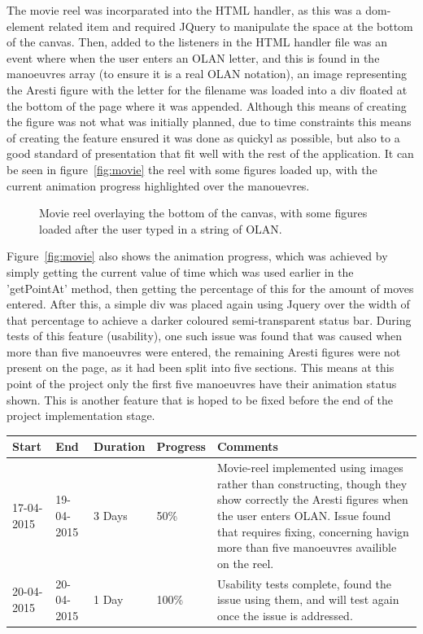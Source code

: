 The movie reel was incorparated into the HTML handler, as this was a dom-element related item and required JQuery to manipulate the space at the bottom of the canvas. Then, added to the listeners in the HTML handler file was an event where when the user enters an OLAN letter, and this is found in the manoeuvres array (to ensure it is a real OLAN notation), an image representing the Aresti figure with the letter for the filename was loaded into a div floated at the bottom of the page where it was appended. Although this means of creating the figure was not what was initially planned, due to time constraints this means of creating the feature ensured it was done as quickyl as possible, but also to a good standard of presentation that fit well with the rest of the application. It can be seen in figure~\ref{fig:movie} the reel with some figures loaded up, with the current animation progress highlighted over the manouevres.

\begin{figure}[h]
  \centering
  \caption{Movie reel overlaying the bottom of the canvas, with some figures loaded after the user typed in a string of OLAN.}
  \label{fig:vectors}
\end{figure}

Figure~\ref{fig:movie} also shows the animation progress, which was achieved by simply getting the current value of time which was used earlier in the 'getPointAt' method, then getting the percentage of this for the amount of moves entered. After this, a simple div was placed again using Jquery over the width of that percentage to achieve a darker coloured semi-transparent status bar. During tests of this feature (usability), one such issue was found that was caused when more than five manoeuvres were entered, the remaining Aresti figures were not present on the page, as it had been split into five sections. This means at this point of the project only the first five manoeuvres have their animation status shown. This is another feature that is hoped to be fixed before the end of the project implementation stage. 

\begin{table}[h]
\begin{tabular}{|l|l|l|l|p{7cm}|}
\hline
\textbf{Start} & \textbf{End} & \textbf{Duration} & \textbf{Progress} & \textbf{Comments}                                                                                                     \\ \hline
17-04-2015     & 19-04-2015   & 3 Days            & 50\%             &  Movie-reel implemented using images rather than constructing, though they show correctly the Aresti figures when the user enters OLAN. Issue found that requires fixing, concerning havign more than five manoeuvres availible on the reel.\\ \hline
20-04-2015     & 20-04-2015   & 1 Day            & 100\%             &  Usability tests complete, found the issue using them, and will test again once the issue is addressed.\\ \hline
\end{tabular}
\end{table}

